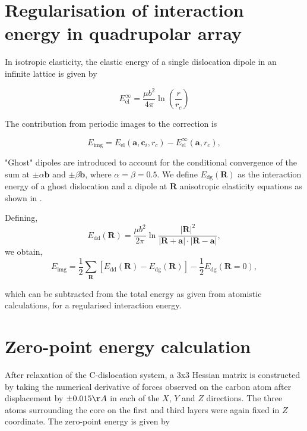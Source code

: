 \documentclass[a4paper,12pt,oneside,print,numbered,index,PageStyleIII]{PhDThesisPSnPDF}
\begin{document}

\begin{appendices} %



\chapter{Regularisation of interaction energy in quadrupolar array}
\label{sec:org9147535}
\label{sec:Ainteractionenergy}


In isotropic elasticity, the elastic energy of a single dislocation dipole in an
infinite lattice is given by


\[ E_{\text{el}}^{\infty} = \frac{\mu b^2}{4\pi} \ln \left( \frac{r}{r_{c}} \right)  \]

The contribution from periodic images to the correction is

\[ E_{\text{img} } = E_{\text{el}} (\mathbf{a}, \mathbf{c}_i , r_c) - E_{\text{el}}^{\infty}
  (\mathbf{a}, r_c),\]

"Ghost" dipoles are introduced to account for the conditional convergence of the sum at \(\pm\alpha
  \mathbf{b}\) and \(\pm \beta\mathbf{b}\), where \(\alpha = \beta = 0.5\). We define \(E_{\text{dg}} (\mathbf{R})\) as the
interaction energy of a ghost dislocation and a dipole at \(\mathbf{R}\) anisotropic elasticity
equations as shown in \cite{Cai2003}.


Defining,
 \[ E_{\text{dd}} (\mathbf{R}) = \frac{\mu b^2}{2\pi}
  \ln \frac{|\mathbf{R}|^2}{|\mathbf{R}+\mathbf{a}|\cdot|\mathbf{R}-\mathbf{a}|},
  \]
we obtain,
\[ E_{\text{img}} = \frac{1}{2}\sum_{\mathbf{R}} [ E_{\text{dd}} (\mathbf{R}) - E_{\text{dg}} (\mathbf{R}) ] - \frac{1}{2}
  E_{\text{dg}} (\mathbf{R} = 0),  \]

which can be subtracted from the total energy as given from atomistic calculations, for a
regularised interaction energy.


\chapter{Zero-point energy calculation}
\label{sec:org84f01e1}
\label{sec:zeropointenergy}

After relaxation of the C-dislocation system, a 3x3 Hessian matrix is constructed by taking the
numerical derivative of forces observed on the carbon atom after displacement by \(\pm 0.015 \AA\) in
each of the \(X\), \(Y\) and \(Z\) directions.  The three atoms surrounding the core on the first and
third layers were again fixed in \(Z\) coordinate. The zero-point energy is given by


\end{appendices}
\end{document}

